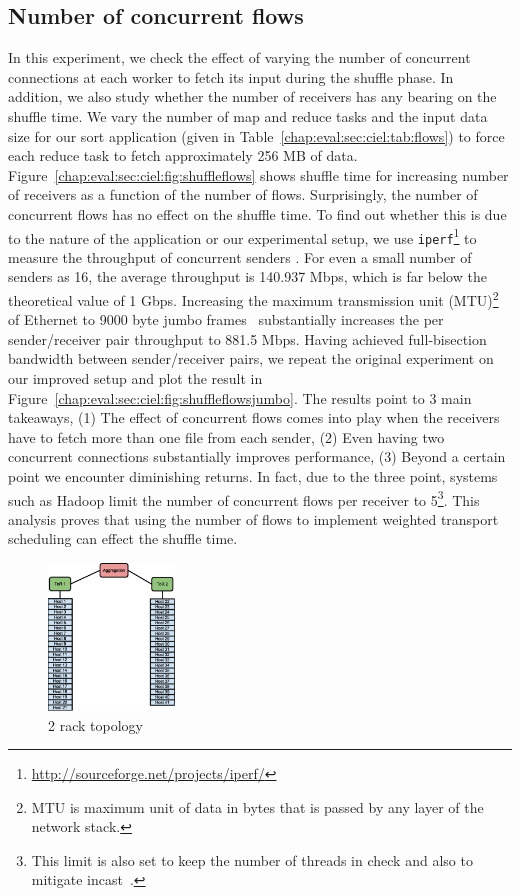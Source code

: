 \documentclass[a4paper,12pt,twoside,openright]{report}
\begin{document}
\subsection{Number of concurrent flows}
In this experiment, we check the effect of varying the number of concurrent
connections at each worker to fetch its input during the shuffle phase. In
addition, we also study whether the number of receivers has any bearing on the
shuffle time. We vary the number of map and reduce tasks and the input data size
for our sort application (given in Table~\ref{chap:eval:sec:ciel:tab:flows}) to
force each reduce task to fetch approximately 256 MB of data.
Figure~\ref{chap:eval:sec:ciel:fig:shuffleflows} shows shuffle time for
increasing number of receivers as a function of the number of flows.
Surprisingly, the number of concurrent flows has no effect on the shuffle time.
To find out whether this is due to the nature of the application or our
experimental setup, we use
\texttt{iperf}\footnote{\url{http://sourceforge.net/projects/iperf/}} to measure
the throughput of concurrent senders . For even a small number of senders as 16,
the average throughput is 140.937 Mbps, which is far below the theoretical value
of 1 Gbps. Increasing the maximum transmission unit (MTU)\footnote{MTU is
maximum unit of data in bytes that is passed by any layer of the network stack.}
of Ethernet to 9000 byte jumbo frames~\cite{Chase:2000:ESO} substantially
increases the per sender/receiver pair throughput to 881.5 Mbps. Having achieved
full-bisection bandwidth between sender/receiver pairs, we repeat the original
experiment on our improved setup and plot the result in
Figure~\ref{chap:eval:sec:ciel:fig:shuffleflowsjumbo}. The results point to 3
main takeaways, (1) The effect of concurrent flows comes into play when the
receivers have to fetch more than one file from each sender, (2) Even having two
concurrent connections substantially improves performance, (3) Beyond a certain
point we encounter diminishing returns. In fact, due to the three point, systems
such as Hadoop limit the number of concurrent flows per receiver to
5\footnote{This limit is also set to keep the number of threads in check and
also to mitigate incast~\cite{Chowdhury:2011:MDT}.}. This analysis proves that
using the number of flows to implement weighted transport scheduling can effect
the shuffle time.
\begin{figure}[h!]
  \centering
    \includegraphics[width=0.3\textwidth]{2_rack_topology.eps}
    \caption{2 rack topology}
    \label{chap:eval:sec:ciel:fig:topology}
\end{figure}
\end{document}

